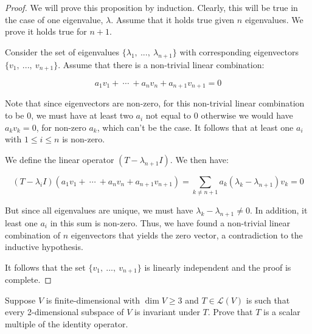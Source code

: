 \documentclass[10pt, oneside]{article}
\newenvironment{problem}[2][Problem]{\begin{trivlist}
\item[\hskip \labelsep {\bfseries #1}\hskip \labelsep {\bfseries #2.}]}{\end{trivlist}}
\begin{document}
    \begin{proof}

      We will prove this proposition by induction. Clearly, this will be true in the case of one eigenvalue, $\lambda$. Assume that
      it holds true given $n$ eigenvalues. We prove it holds true for $n + 1$.

      Consider the set of eigenvalues $\{\lambda_1, \ ..., \ \lambda_{n + 1}\}$ with
      corresponding eigenvectors $\{v_1, \ ..., \ v_{n + 1}\}$.
      Assume that there is a non-trivial linear combination:

      $$a_{1} v_1 + \ \cdots \ + a_{n} v_{n} + a_{n + 1} v_{n + 1} = 0$$

      Note that since eigenvectors are non-zero, for this non-trivial linear combination to be $0$, we must have at least two $a_i$ not equal to
      $0$ otherwise we would have $a_k v_k = 0$, for non-zero $a_k$, which can't be the case. It follows that at least one $a_i$ with $1 \leq i \leq n$
      is non-zero.


      We define the linear operator $(T - \lambda_{n + 1} I)$. We then have:

      $$(T - \lambda_i I)(a_1 v_1 + \ \cdots \ + a_n v_n + a_{n + 1} v_{n + 1}) = \displaystyle\sum_{k \neq n + 1} a_k (\lambda_k - \lambda_{n + 1}) v_k = 0$$

      But since all eigenvalues are unique, we must have $\lambda_k - \lambda_{n + 1} \neq 0$. In addition, it least one $a_i$ in this sum is non-zero. Thus,
      we have found a non-trivial linear combination of $n$ eigenvectors that yields the zero vector, a contradiction to the inductive hypothesis.
      \newline

      It follows that the set $\{v_1, \ ..., \ v_{n + 1}\}$ is linearly independent and the proof is complete.

      \end{proof}

    \begin{problem}{5.28}
      Suppose $V$ is finite-dimensional with $\dim V \geq 3$ and $T \in \mathcal{L}(V)$ is such that every 2-dimensional subspace of $V$ is
      invariant under $T$. Prove that $T$ is a scalar multiple of the identity operator.
    \end{problem}
\end{document}
